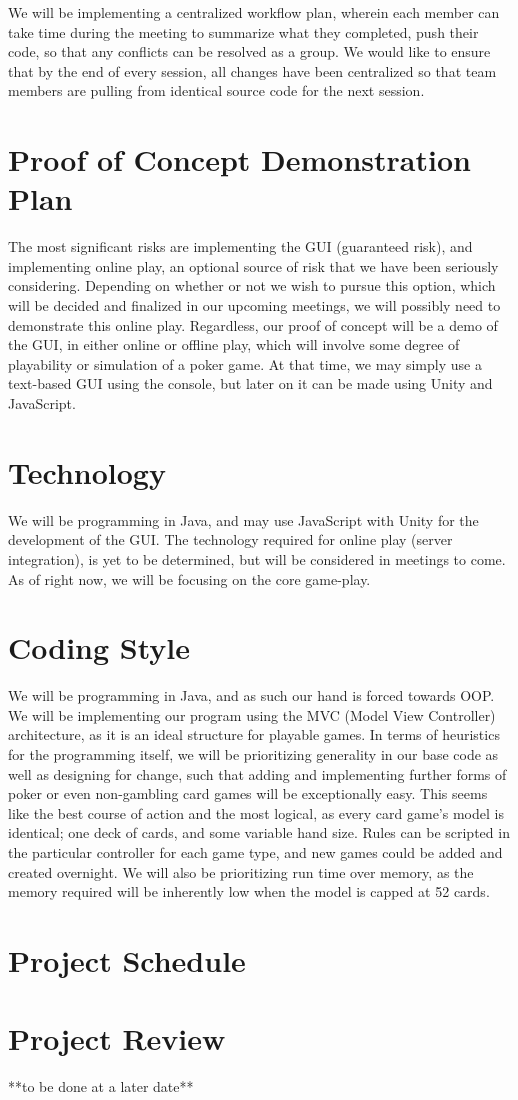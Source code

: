 \documentclass{article}
\begin{document}
We will be implementing a centralized workflow plan, wherein each member can take time during the meeting to summarize what they completed, push their code, so that any conflicts can be resolved as a group. We would like to ensure that by the end of every session, all changes have been centralized so that team members are pulling from identical source code for the next session. 

\section{Proof of Concept Demonstration Plan}

The most significant risks are implementing the GUI (guaranteed risk), and implementing online play, an optional source of risk that we have been seriously considering. Depending on whether or not we wish to pursue this option, which will be decided and finalized in our upcoming meetings, we will possibly need to demonstrate this online play. Regardless, our proof of concept will be a demo of the GUI, in either online or offline play, which will involve some degree of playability or simulation of a poker game. At that time, we may simply use a text-based GUI using the console, but later on it can be made using Unity and JavaScript. 


\section{Technology}

We will be programming in Java, and may use JavaScript with Unity for the development of the GUI. The technology required for online play (server integration), is yet to be determined, but will be considered in meetings to come. As of right now, we will be focusing on the core game-play. 


\section{Coding Style}

We will be programming in Java, and as such our hand is forced towards OOP. We will be implementing our program using the MVC (Model View Controller) architecture, as it is an ideal structure for playable games. In terms of heuristics for the programming itself, we will be prioritizing generality in our base code as well as designing for change, such that adding and implementing further forms of poker or even non-gambling card games will be exceptionally easy. This seems like the best course of action and the most logical, as every card game's model is identical; one deck of cards, and some variable hand size. Rules can be scripted in the particular controller for each game type, and new games could be added and created overnight. We will also be prioritizing run time over memory, as the memory required will be inherently low when the model is capped at 52 cards. 

\section{Project Schedule}



\section{Project Review}
**to be done at a later date**
\end{document}
